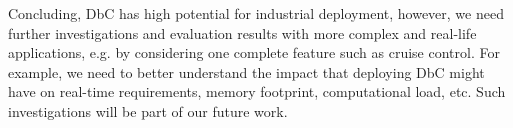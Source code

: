 Concluding, DbC has high potential for industrial deployment, however, we need further investigations and evaluation results with more complex and real-life applications, e.g. by considering one complete feature such as cruise control. For example,  we need to better understand the impact that deploying DbC might have on real-time requirements, memory footprint, computational load,  etc. Such investigations will be part of our future work.

